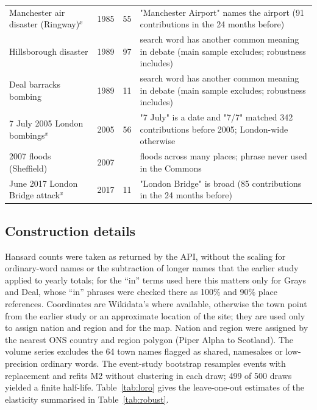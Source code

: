\documentclass[11pt,a4paper]{article}
\begin{document}
{\begin{longtable}{p{5.4cm}rrp{8cm}}
Manchester air disaster (Ringway)$^x$ & 1985 & 55 & "Manchester Airport" names the airport (91 contributions in the 24 months before)\\
Hillsborough disaster & 1989 & 97 & search word has another common meaning in debate (main sample excludes; robustness includes)\\
Deal barracks bombing & 1989 & 11 & search word has another common meaning in debate (main sample excludes; robustness includes)\\
7 July 2005 London bombings$^x$ & 2005 & 56 & "7 July" is a date and "7/7" matched 342 contributions before 2005; London-wide otherwise\\
2007 floods (Sheffield) & 2007 &  & floods across many places; phrase never used in the Commons\\
June 2017 London Bridge attack$^x$ & 2017 & 11 & "London Bridge" is broad (85 contributions in the 24 months before)\\
\end{longtable}}

\subsection{Construction details}
Hansard counts were taken as returned by the API, without the scaling for ordinary-word names or the subtraction of longer names that the earlier study applied to yearly totals; for the ``in'' terms used here this matters only for Grays and Deal, whose ``in'' phrases were checked there as 100\% and 90\% place references. Coordinates are Wikidata's where available, otherwise the town point from the earlier study or an approximate location of the site; they are used only to assign nation and region and for the map. Nation and region were assigned by the nearest ONS country and region polygon (Piper Alpha to Scotland). The volume series excludes the 64 town names flagged as shared, namesakes or low-precision ordinary words. The event-study bootstrap resamples events with replacement and refits M2 without clustering in each draw; 499 of 500 draws yielded a finite half-life. Table~\ref{tab:loro} gives the leave-one-out estimates of the elasticity summarised in Table~\ref{tab:robust}.
\end{document}
